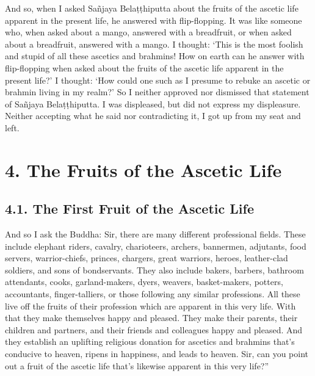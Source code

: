 \documentclass[12pt,openany]{book}%
\begin{document}
And so, when I asked \textsanskrit{Sañjaya} \textsanskrit{Belaṭṭhiputta} about the fruits of the ascetic life apparent in the present life, he answered with flip-flopping. It was like someone who, when asked about a mango, answered with a breadfruit, or when asked about a breadfruit, answered with a mango. I thought: ‘This is the most foolish and stupid of all these ascetics and brahmins! How on earth can he answer with flip-flopping when asked about the fruits of the ascetic life apparent in the present life?’ I thought: ‘How could one such as I presume to rebuke an ascetic or brahmin living in my realm?’ So I neither approved nor dismissed that statement of \textsanskrit{Sañjaya} \textsanskrit{Belaṭṭhiputta}. I was displeased, but did not express my displeasure. Neither accepting what he said nor contradicting it, I got up from my seat and left. 

\section*{4. The Fruits of the Ascetic Life }

\subsection*{4.1. The First Fruit of the Ascetic Life }

And so I ask the Buddha: Sir, there are many different professional fields. These include elephant riders, cavalry, charioteers, archers, bannermen, adjutants, food servers, warrior-chiefs, princes, chargers, great warriors, heroes, leather-clad soldiers, and sons of bondservants. They also include bakers, barbers, bathroom attendants, cooks, garland-makers, dyers, weavers, basket-makers, potters, accountants, finger-talliers, or those following any similar professions. All these live off the fruits of their profession which are apparent in this very life. With that they make themselves happy and pleased. They make their parents, their children and partners, and their friends and colleagues happy and pleased. And they establish an uplifting religious donation for ascetics and brahmins that’s conducive to heaven, ripens in happiness, and leads to heaven. Sir, can you point out a fruit of the ascetic life that’s likewise apparent in this very life?” 
\end{document}
